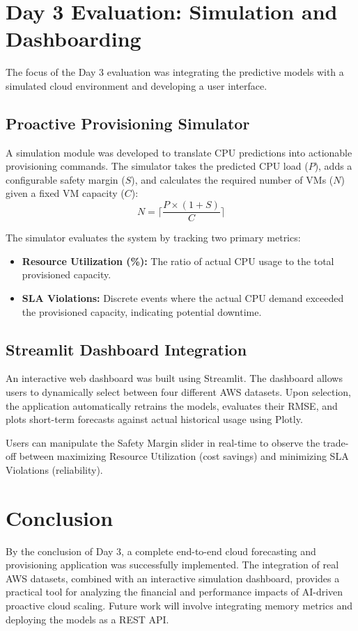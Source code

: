 \documentclass[journal,onecolumn]{IEEEtran}
\begin{document}
\section{Day 3 Evaluation: Simulation and Dashboarding}
The focus of the Day 3 evaluation was integrating the predictive models with a simulated cloud environment and developing a user interface.

\subsection{Proactive Provisioning Simulator}
A simulation module was developed to translate CPU predictions into actionable provisioning commands. The simulator takes the predicted CPU load ($P$), adds a configurable safety margin ($S$), and calculates the required number of VMs ($N$) given a fixed VM capacity ($C$):
\begin{equation}
    N = \lceil \frac{P \times (1 + S)}{C} \rceil
\end{equation}

The simulator evaluates the system by tracking two primary metrics:
\begin{itemize}
    \item \textbf{Resource Utilization (\%):} The ratio of actual CPU usage to the total provisioned capacity.
    \item \textbf{SLA Violations:} Discrete events where the actual CPU demand exceeded the provisioned capacity, indicating potential downtime.
\end{itemize}

\subsection{Streamlit Dashboard Integration}
An interactive web dashboard was built using Streamlit. The dashboard allows users to dynamically select between four different AWS datasets. Upon selection, the application automatically retrains the models, evaluates their RMSE, and plots short-term forecasts against actual historical usage using Plotly.

Users can manipulate the Safety Margin slider in real-time to observe the trade-off between maximizing Resource Utilization (cost savings) and minimizing SLA Violations (reliability).

\section{Conclusion}
By the conclusion of Day 3, a complete end-to-end cloud forecasting and provisioning application was successfully implemented. The integration of real AWS datasets, combined with an interactive simulation dashboard, provides a practical tool for analyzing the financial and performance impacts of AI-driven proactive cloud scaling. Future work will involve integrating memory metrics and deploying the models as a REST API.
\end{document}
